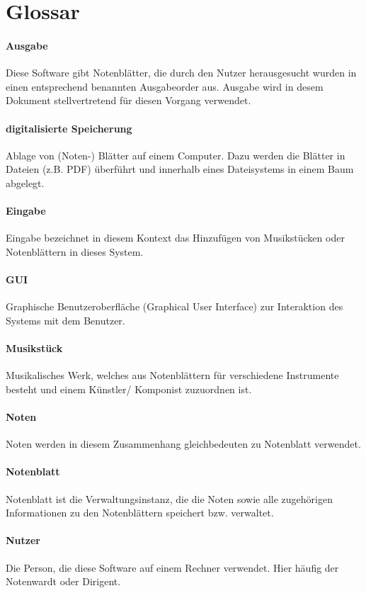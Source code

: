 \documentclass[a4paper,10pt]{scrartcl}
\begin{document}
\section{Glossar}
\paragraph*{Ausgabe} Diese Software gibt Notenblätter, die durch den Nutzer herausgesucht wurden in einen entsprechend benannten Ausgabeorder aus. Ausgabe wird in desem Dokument stellvertretend für diesen Vorgang verwendet.
\paragraph*{digitalisierte Speicherung} Ablage von (Noten-) Blätter auf einem Computer. Dazu werden die Blätter in Dateien (z.B. PDF) überführt und innerhalb eines Dateisystems in einem Baum abgelegt.
\paragraph*{Eingabe} Eingabe bezeichnet in diesem Kontext das Hinzufügen von Musikstücken oder Notenblättern in dieses System.
\paragraph*{GUI} Graphische Benutzeroberfläche (Graphical User Interface) zur Interaktion des Systems mit dem Benutzer.
\paragraph*{Musikstück} Musikalisches Werk, welches aus Notenblättern für verschiedene Instrumente besteht  und einem Künstler/ Komponist zuzuordnen ist.
\paragraph*{Noten} Noten werden in diesem Zusammenhang gleichbedeuten zu Notenblatt verwendet.
\paragraph*{Notenblatt} Notenblatt ist die Verwaltungsinstanz, die die Noten sowie alle zugehörigen Informationen zu den Notenblättern speichert bzw. verwaltet.
\paragraph*{Nutzer} Die Person, die diese Software auf einem Rechner verwendet. Hier häufig der Notenwardt oder Dirigent.
\end{document}
